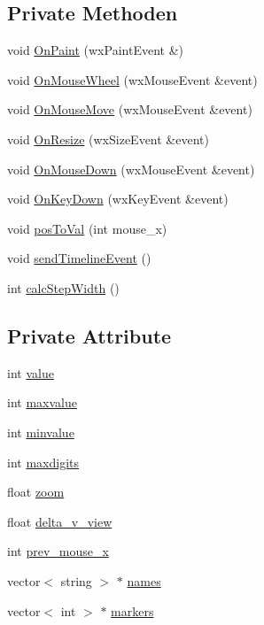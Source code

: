 \subsection*{Private Methoden}
\begin{DoxyCompactItemize}
\item 
void \hyperlink{classGUITimeline_a55f17926f5dd787c8ae118127f73ca88}{On\-Paint} (wx\-Paint\-Event \&)
\item 
void \hyperlink{classGUITimeline_a23116af54d562cef9cb891adf2358a06}{On\-Mouse\-Wheel} (wx\-Mouse\-Event \&event)
\item 
void \hyperlink{classGUITimeline_a7d53538e56f4571e729dfe64a820ddf2}{On\-Mouse\-Move} (wx\-Mouse\-Event \&event)
\item 
void \hyperlink{classGUITimeline_a0cba2d830e1d9189b664cd512576be36}{On\-Resize} (wx\-Size\-Event \&event)
\item 
void \hyperlink{classGUITimeline_a7254dd9824190a6288da682d8fefad09}{On\-Mouse\-Down} (wx\-Mouse\-Event \&event)
\item 
void \hyperlink{classGUITimeline_a82c3ff544345678870f3738443387bc0}{On\-Key\-Down} (wx\-Key\-Event \&event)
\item 
void \hyperlink{classGUITimeline_a2cd5cc2f150a7ca94a4cddbb88843b21}{pos\-To\-Val} (int mouse\-\_\-x)
\item 
void \hyperlink{classGUITimeline_a417835c7c520d9fbcf65610d255245a1}{send\-Timeline\-Event} ()
\item 
int \hyperlink{classGUITimeline_a98e636407ed0691d655eaa53cd0d968c}{calc\-Step\-Width} ()
\end{DoxyCompactItemize}
\subsection*{Private Attribute}
\begin{DoxyCompactItemize}
\item 
int \hyperlink{classGUITimeline_a0ba036e4a58176c5e868662510717ae2}{value}
\item 
int \hyperlink{classGUITimeline_a6c639803db9c5afff38d3221242da912}{maxvalue}
\item 
int \hyperlink{classGUITimeline_aad9f2b796d0d7c086cfe0094b3ef10c5}{minvalue}
\item 
int \hyperlink{classGUITimeline_a880c85a1838b77e7dd2c03601c15e36b}{maxdigits}
\item 
float \hyperlink{classGUITimeline_a9b5b63103a41b6e661cfb30acfcda448}{zoom}
\item 
float \hyperlink{classGUITimeline_aba3c330e3e9e5f2f5edb069ecbb9c488}{delta\-\_\-v\-\_\-view}
\item 
int \hyperlink{classGUITimeline_a16d456832948e97e9364856f92d97f5c}{prev\-\_\-mouse\-\_\-x}
\item 
vector$<$ string $>$ $\ast$ \hyperlink{classGUITimeline_adcdd8d58db7851c24ab9dfdfe1377ffb}{names}
\item 
vector$<$ int $>$ $\ast$ \hyperlink{classGUITimeline_a8e20b6ed00d7c48716256fffdcfa608a}{markers}
\end{DoxyCompactItemize}


